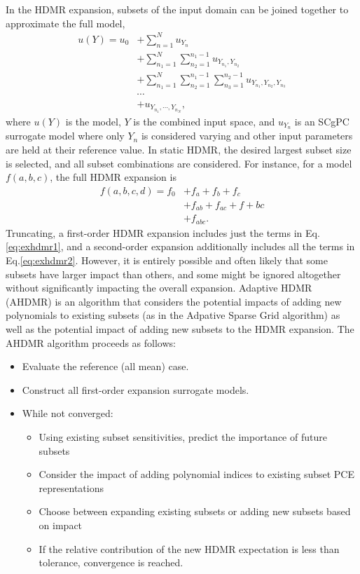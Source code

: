 In the HDMR expansion, subsets of the input domain can be
joined together to approximate the full model,
\begin{align}
  u(Y) = u_0 &+ \sum_{n=1}^N u_{Y_n} \nonumber\\
  &+ \sum_{n_1=1}^N \sum_{n_2=1}^{n_1-1} u_{Y_{n_1},Y_{n_2}} \nonumber \\
  &+ \sum_{n_1=1}^N \sum_{n_2=1}^{n_1-1} \sum_{n_3=1}^{n_2-1} u_{Y_{n_1},Y_{n_2},Y_{n_3}} \nonumber \\
  &\cdots \nonumber\\
  &+u_{Y_{n_1},\cdots,Y_{n_N}},
\end{align}
where $u(Y)$ is the model, $Y$ is the combined input space, and $u_{Y_n}$ is an SCgPC surrogate model where
only $Y_n$ is considered varying and other input parameters are held at their reference value.  In static
HDMR, the desired largest subset size is selected, and all subset combinations are considered.  For instance,
for a model $f(a,b,c)$, the full HDMR expansion is
\begin{align}
  f(a,b,c,d) = f_0 &+ f_a + f_b + f_c \label{eq:exhdmr1}\\
    &+ f_{ab} + f_{ac} + f+{bc} \label{eq:exhdmr2}\\
    &+ f_{abc}. \label{eq:exhdmr3}
\end{align}
Truncating, a first-order HDMR expansion includes just the terms in Eq.\ref{eq:exhdmr1}, and a second-order
expansion additionally includes all the terms in Eq.\ref{eq:exhdmr2}.  However, it is entirely possible and
often likely that
some subsets have larger impact than others, and some might be ignored altogether without significantly
impacting the overall expansion.  Adaptive HDMR (AHDMR) is an algorithm that considers the potential impacts
of adding new polynomials to existing subsets (as in the Adpative Sparse Grid algorithm) as well as the
potential impact of adding new subsets to the HDMR expansion. The AHDMR algorithm proceeds as follows:
\begin{itemize}
  \item Evaluate the reference (all mean) case.
  \item Construct all first-order expansion surrogate models.
  \item While not converged:
  \begin{itemize}
    \item Using existing subset sensitivities, predict the importance of future subsets
    \item Consider the impact of adding polynomial indices to existing subset PCE representations
    \item Choose between expanding existing subsets or adding new subsets based on impact
    \item If the relative contribution of the new HDMR expectation is less than tolerance, convergence is
      reached.
  \end{itemize}
\end{itemize}
